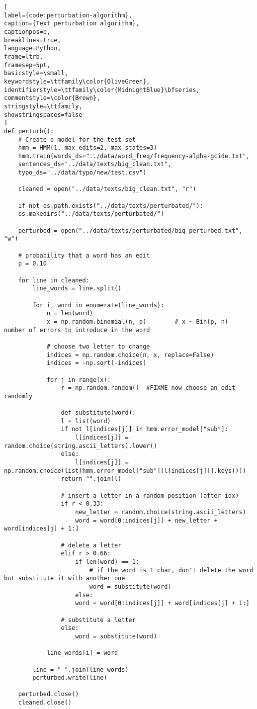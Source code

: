 \begin{lstlisting}[
label={code:perturbation-algorithm},
caption={Text perturbation algorithm},
captionpos=b,
breaklines=true,                                    
language=Python,
frame=ltrb,
framesep=5pt,
basicstyle=\small,
keywordstyle=\ttfamily\color{OliveGreen},
identifierstyle=\ttfamily\color{MidnightBlue}\bfseries,
commentstyle=\color{Brown},
stringstyle=\ttfamily,
showstringspaces=false
]
def perturb():
	# Create a model for the test set
	hmm = HMM(1, max_edits=2, max_states=3)
	hmm.train(words_ds="../data/word_freq/frequency-alpha-gcide.txt",
	sentences_ds="../data/texts/big_clean.txt",
	typo_ds="../data/typo/new/test.csv")
	
	cleaned = open("../data/texts/big_clean.txt", "r")
	
	if not os.path.exists("../data/texts/perturbated/"):
	os.makedirs("../data/texts/perturbated/")
	
	perturbed = open("../data/texts/perturbated/big_perturbed.txt", "w")
	
	# probability that a word has an edit
	p = 0.10
	
	for line in cleaned:
		line_words = line.split()
		
		for i, word in enumerate(line_words):
			n = len(word)
			x = np.random.binomial(n, p)        # x ~ Bin(p, n)  number of errors to introduce in the word
			
			# choose two letter to change
			indices = np.random.choice(n, x, replace=False)
			indices = -np.sort(-indices)
			
			for j in range(x):
				r = np.random.random()  #FIXME now choose an edit randomly
				
				def substitute(word):
				l = list(word)
				if not l[indices[j]] in hmm.error_model["sub"]:
					l[indices[j]] = random.choice(string.ascii_letters).lower()
				else:
					l[indices[j]] = np.random.choice(list(hmm.error_model["sub"][l[indices[j]]].keys()))
				return "".join(l)
				
				# insert a letter in a random position (after idx)
				if r < 0.33:
					new_letter = random.choice(string.ascii_letters)
					word = word[0:indices[j]] + new_letter + word[indices[j] + 1:]
				
				# delete a letter
				elif r > 0.66:
					if len(word) == 1:
						# if the word is 1 char, don't delete the word but substitute it with another one
						word = substitute(word)
					else:
					word = word[0:indices[j]] + word[indices[j] + 1:]
				
				# substitute a letter
				else:
					word = substitute(word)
			
			line_words[i] = word
		
		line = " ".join(line_words)
		perturbed.write(line)
	
	perturbed.close()
	cleaned.close()
\end{lstlisting}


